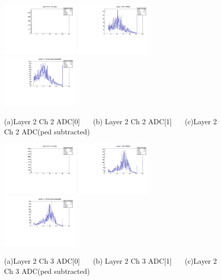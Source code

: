 \documentclass[a4paper,11pt]{article}
\theoremstyle{mytheor}
\begin{document}
\begin{figure}[H] 
\vspace*{-0.3cm} 
\includegraphics[width=0.33\textwidth,scale=0.5,trim=0 0 0 0,clip]{plotsdir/file0_muons-Layer2_Ch2_adc0-1.pdf} 
\includegraphics[width=0.33\textwidth,scale=0.5,trim=0 0 0 0,clip]{plotsdir/file0_muons-Layer2_Ch2_adc1-1.pdf} 
\includegraphics[width=0.33\textwidth,scale=0.5,trim=0 0 0 0,clip]{plotsdir/file0_muons-Layer2_Ch2_adcPedsub-1.pdf} 
\caption{(a)Layer 2 Ch 2 ADC[0] ~~~(b) Layer 2 Ch 2 ADC[1] ~~~(c)Layer 2 Ch 2 ADC(ped subtracted) } 
\end{figure} 
\begin{figure}[H] 
\vspace*{-0.3cm} 
\includegraphics[width=0.33\textwidth,scale=0.5,trim=0 0 0 0,clip]{plotsdir/file0_muons-Layer2_Ch3_adc0-1.pdf} 
\includegraphics[width=0.33\textwidth,scale=0.5,trim=0 0 0 0,clip]{plotsdir/file0_muons-Layer2_Ch3_adc1-1.pdf} 
\includegraphics[width=0.33\textwidth,scale=0.5,trim=0 0 0 0,clip]{plotsdir/file0_muons-Layer2_Ch3_adcPedsub-1.pdf} 
\caption{(a)Layer 2 Ch 3 ADC[0] ~~~(b) Layer 2 Ch 3 ADC[1] ~~~(c)Layer 2 Ch 3 ADC(ped subtracted) } 
\end{figure} 
\end{document}
